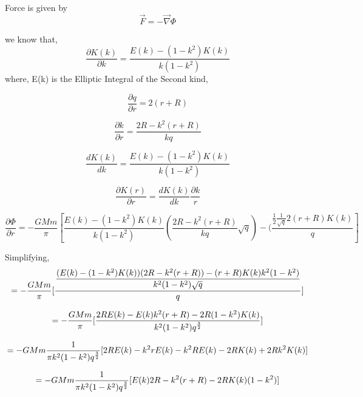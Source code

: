 Force is given by
\begin{equation}
   \vec{F} = - \vec{\nabla} \Phi 
\end{equation}

we know that,
\begin{equation}
   \frac{\partial K (k)}{\partial k } = \frac{E(k)- (1-k^2) K(k)}{k(1- k^2)} 
\end{equation}
where, E(k) is the Elliptic Integral of the Second kind,

\begin{equation}
 \frac{\partial q}{\partial r} = 2 (r + R)
\end{equation}

\begin{equation}
 \frac{\partial k}{\partial r} = \frac{2R - k^2 (r + R)}{kq} 
\end{equation}

\begin{equation}
\frac{d K(k)}{d k} = \frac{E(k) - (1-k^2) K(k)}{k (1-k^2)} 
\end{equation}

\begin{equation}
\frac{\partial K (r)}{\partial r} = \frac{d K(k)}{dk} \frac{\partial k }{r} 
\end{equation}

\begin{equation}
\frac{\partial \Phi}{\partial r} = - \frac{GMm }{\pi} [ \frac{E(k) - (1-k^2) K(k)}{k (1-k^2)} (\frac{2R - k^2 (r + R)}{kq} \sqrt{q}) - (\frac{\frac{1}{2} \frac{1}{\sqrt{q}}2 (r + R ) K(k)} {q}] 
\end{equation}

Simplifying,
\begin{equation}
   \begin{gathered}
      = - \frac{GMm }{\pi} [\dfrac{\dfrac{(E(k)- (1 - k^2 )K(k))(2 R - k^2 (r + R)) - (r + R) K(k) k^2 (1 - k^2)}{k^2 (1-k^2)\sqrt{q}}}{q}]\\[0.5\baselineskip]
      = - \frac{GMm }{\pi} [\frac{2 R E(k) - E (k) k^2 (r+R) - 2 R(1-k^2) K(k)}{k^2 (1 - k^2) q^\frac{3}{2}}]\\[0.5\baselineskip]
      = - GMm \frac{1}{\pi k^2 (1 - k ^2)  q^\frac{3}{2}} [2 R E (k) - k^2 r E(k)- k^2 R E(k) - 2 R K(k) + 2 R k^2 K(k)]\\[0.5\baselineskip]
      = - GMm \frac{1}{\pi k^2 (1 - k ^2)  q^\frac{3}{2}} [E (k) 2R - k^2 (r + R) - 2 R K(k) (1 - k^2) ] 
   \end{gathered}
\end{equation}
 
